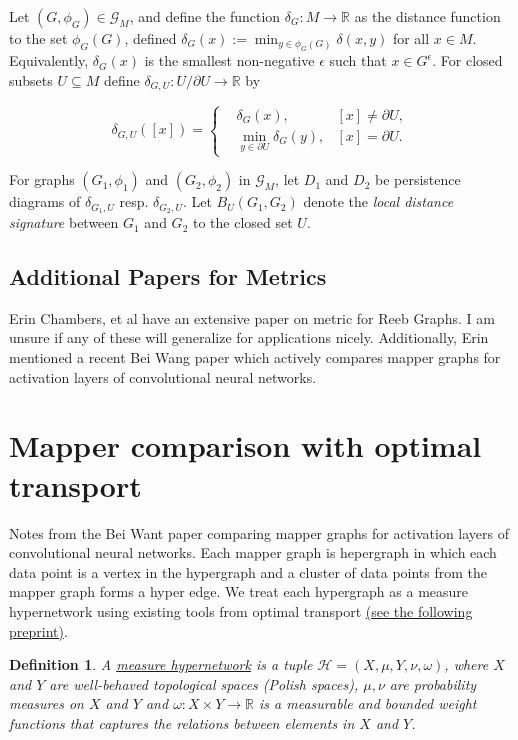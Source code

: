 \documentclass{article}
\def\R{\mathbb{R}}
\newtheorem{definition}{Definition}[section]
\begin{document}
Let $(G,\phi_G)\in\mathcal{G}_M$, and define the function $\delta_G\colon M\to\R$ as the distance function to the set $\phi_G(G)$, defined $\delta_G(x):=\min_{y\in\phi_G(G)}\delta(x,y)$ for all $x\in M$. Equivalently, $\delta_G(x)$ is the smallest non-negative $\epsilon$ such that $x\in G^\epsilon$. For closed subsets $U\subseteq M$ define $\delta_{G,U}\colon U/\partial U\to \R$ by 

\begin{equation}
\delta_{G,U}([x])=\left\{
\begin{aligned}
&\delta_G(x),\quad &[x]\neq\partial U,\\
&\min_{y\in\partial U}\delta_G(y), &[x]=\partial U.
\end{aligned}\right.
\end{equation}

For graphs $(G_1,\phi_1)$ and $(G_2,\phi_2)$ in $\mathcal{G}_M$, let $D_1$ and $D_2$ be persistence diagrams of $\delta_{G_1,U}$ resp. $\delta_{G_2,U}$. Let $B_U(G_1,G_2)$ denote the \textit{local distance signature} between $G_1$ and $G_2$ to the closed set $U$.

\subsection{Additional Papers for Metrics}
Erin Chambers, et al \cite{bollen2022reebgraphmetricsground} have an extensive paper on metric for Reeb Graphs. I am unsure if any of these will generalize for applications nicely. Additionally, Erin mentioned a recent Bei Wang paper \cite{mapper-AI-activations} which actively compares mapper graphs for activation layers of convolutional neural networks. 

\section{Mapper comparison with optimal transport}
Notes from the Bei Want paper comparing mapper graphs for activation layers of convolutional neural networks. 
Each mapper graph is hepergraph in which each data point is a vertex in the hypergraph and a cluster of data points from the mapper graph forms a hyper edge. We treat each hypergraph as a measure hypernetwork using existing tools from optimal transport \href{https://arxiv.org/pdf/2112.03904}{(see the following preprint)}.

\begin{definition}
    A \underline{measure hypernetwork} is a tuple $\mathcal{H}=(X,\mu,Y,\nu,\omega)$, where $X$ and $Y$ are well-behaved topological spaces (Polish spaces), $\mu,\nu$ are probability measures on $X$ and $Y$ and $\omega\colon X\times Y\to \R$ is a measurable and bounded weight functions that captures the relations between elements in $X$ and $Y$.
\end{definition}
\end{document}
